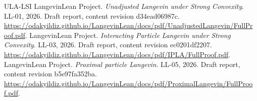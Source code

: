\documentclass[11pt,a4paper]{article}
\begin{document}
\begin{thebibliography}{ULA-LSI}
LangevinLean Project. \emph{Unadjusted Langevin under Strong Convexity}. LL-01, 2026. Draft report, content revision d34ead06987c. \url{https://odakyildiz.github.io/LangevinLean/docs/pdf/UnadjustedLangevin/FullProof.pdf}.
LangevinLean Project. \emph{Interacting Particle Langevin under Strong Convexity}. LL-03, 2026. Draft report, content revision ec0201df2207. \url{https://odakyildiz.github.io/LangevinLean/docs/pdf/IPLA/FullProof.pdf}.
LangevinLean Project. \emph{Proximal particle Langevin}. LL-05, 2026. Draft report, content revision b5e97fa352ba. \url{https://odakyildiz.github.io/LangevinLean/docs/pdf/ProximalLangevin/FullProof.pdf}.
\end{thebibliography}
\end{document}
